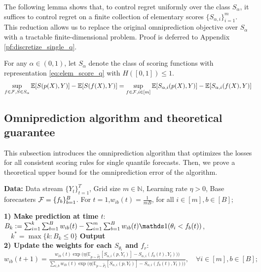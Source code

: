 The following lemma shows that, to control regret uniformly over the class $S_\alpha$, it suffices to control regret on a finite collection of elementary scores $\{S_{\alpha,i}\}_{i=1}^m$. This reduction allows us to replace the original omniprediction objective over $S_\alpha$ with a tractable finite-dimensional problem. Proof is deferred to Appendix \ref{pf:discretize_single_q}.

\begin{lemma} \label{lem:discretize_single_q}
  For any $\alpha \in (0,1) $, let $S_\alpha$ denote the class of scoring functions with representation \eqref{eq:elem_score_q} with $H([0,1]) \leq 1$.
\[
\sup_{f\in\mathcal{F}, S\in S_\alpha} \mathbb{E}[S(p(X),Y)] - \mathbb{E}[S(f(X),Y)] 
=
\sup_{f\in\mathcal{F}, i\in[m]} \mathbb{E}[S_{\alpha,i}(p(X),Y)] - \mathbb{E}[S_{\alpha,i}(f(X),Y)] 
\]
\end{lemma}





\subsection{Omniprediction algorithm and theoretical guarantee} \label{subsec:omni_single_q}
This subsection introduces the omniprediction algorithm that optimizes the losses for all consistent scoring rules for single quantile forecasts. Then, we prove a theoretical upper bound for the omniprediction error of the algorithm.

\begin{algorithm}[h]
  \caption{Single quantile level omniprediction} \label{alg:omni-twoplayer_online_q}
  \begin{algorithmic}[1]
  \State \textbf{Data:} Data stream $\{Y_t\}_{t=1}^T$, Grid size $m \in \mathbb{N}$, Learning rate $\eta > 0$, Base forecasters $\mathcal{F} = \{f_b\}_{b=1}^{B}$.
  \State For $t=1$,$w_{ib}(t) = \frac{1}{mB}$, for all $i \in [m], b \in [B]$;

    \State \textbf{1) Make prediction at time $t$}:
    \State $B_k := \sum_{i=1}^{k} \sum_{b=1}^B w_{ib}(t) - \sum_{i=1}^{m} \sum_{b=1}^B w_{ib}(t) \one(\theta_i < f_b(t))$, $\quad k^* = \max\{k: B_k \leq 0\}$
      \State \textbf{Output}
       \vspace{-0.1cm}\\
      \State \textbf{2) Update the weights for each $S_{\theta_i}$ and $f_r$}:
          \State $w_{ib}(t+1) = \frac{w_{ib}(t) \exp\bigl(\eta \big(\mathbb{E}_{p \sim \hat{P}_t}[S_{\alpha, i}(p, Y_t)] 
          - S_{\alpha, i}(f_b(t), Y_t)\big)\bigr)}{\sum_{i,b} w_{ib}(t) \exp\bigl(\eta \big(\mathbb{E}_{p \sim \hat{P}_t}[S_{\alpha, i}(p, Y_t)] 
          - S_{\alpha, i}(f_b(t), Y_t)\big)\bigr)}, \quad \forall i \in [m], b \in [B];$ \vspace{-0.1cm}\\
  \EndFor
  \end{algorithmic}
\end{algorithm}



